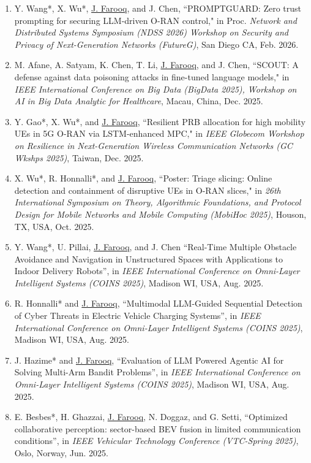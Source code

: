 \documentclass[letterpaper,11pt]{article}
\begin{document}
\begin{enumerate}
      \item[\rm{[C41]}] Y. Wang*, X. Wu*, \underline{J. Farooq}, and J. Chen, ``PROMPTGUARD: Zero trust prompting for securing LLM-driven O-RAN control," in Proc. \emph{Network and Distributed Systems Symposium (NDSS 2026) Workshop on Security and Privacy of Next-Generation Networks (FutureG)}, San Diego CA, Feb. 2026.
      \item[\rm{[C40]}] M. Afane, A. Satyam, K. Chen, T. Li, \underline{J. Farooq}, and J. Chen, ``SCOUT: A defense against data poisoning attacks in fine-tuned language models," in \emph{IEEE International Conference on Big Data (BigData 2025), Workshop on AI in Big Data Analytic for Healthcare}, Macau, China, Dec. 2025.
      \item[\rm{[C39]}] Y. Gao*, X. Wu*, and \underline{J. Farooq}, ``Resilient PRB allocation for high mobility UEs in 5G O-RAN via LSTM-enhanced MPC," in \emph{IEEE Globecom Workshop on Resilience in Next-Generation Wireless Communication Networks (GC Wkshps 2025)}, Taiwan, Dec. 2025.
      \item[\rm{[C38]}] X. Wu*, R. Honnalli*, and \underline{J. Farooq}, ``Poster: Triage slicing: Online detection and containment of disruptive UEs in O-RAN slices," in \emph{26th International Symposium on Theory, Algorithmic Foundations, and Protocol Design for Mobile Networks and Mobile Computing (MobiHoc 2025)}, Houson, TX, USA, Oct. 2025.
      \item[\rm{[C37]}] Y. Wang*, U. Pillai, \underline{J. Farooq}, and J. Chen ``Real-Time Multiple Obstacle Avoidance and Navigation in Unstructured Spaces with Applications to Indoor Delivery Robots'', in \emph{IEEE International Conference on Omni-Layer Intelligent Systems (COINS 2025)}, Madison WI, USA, Aug. 2025.
      \item[\rm{[C36]}] R. Honnalli* and \underline{J. Farooq}, ``Multimodal LLM-Guided Sequential Detection of Cyber Threats in Electric Vehicle Charging Systems'', in \emph{IEEE International Conference on Omni-Layer Intelligent Systems (COINS 2025)}, Madison WI, USA, Aug. 2025.
      \item[\rm{[C35]}] J. Hazime* and \underline{J. Farooq}, ``Evaluation of LLM Powered Agentic AI for Solving Multi-Arm Bandit Problems'', in \emph{IEEE International Conference on Omni-Layer Intelligent Systems (COINS 2025)}, Madison WI, USA, Aug. 2025.
      \item[\rm{[C34]}] E. Besbes*, H. Ghazzai, \underline{J. Farooq}, N. Doggaz, and G. Setti, ``Optimized collaborative perception: sector-based BEV fusion in limited communication conditions'', in \emph{IEEE Vehicular Technology Conference (VTC-Spring 2025)}, Oslo, Norway, Jun. 2025.

\end{enumerate}
\end{document}
